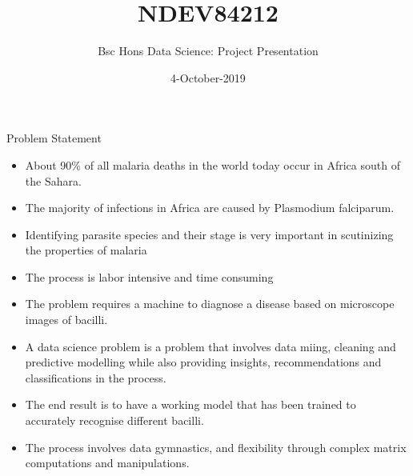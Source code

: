 \documentclass{beamer}
\title[Project Presentation]{NDEV84212}
\author[Olatomiwa Akinlaja]{Bsc Hons Data Science: Project Presentation}
\institute[SPU]{\textbf{\large Olatomiwa O. Akinlaja}}
\date{4-October-2019}
\begin{document}
\frame{\titlepage}
\begin{frame}[t]{Problem Statement}
\vspace{1pt}\small

	\begin{itemize}
	\item About 90\% of all malaria deaths in the world today occur in Africa south of the Sahara.
	\item The majority of infections in Africa are caused by Plasmodium falciparum. 
	\item Identifying parasite species and their stage is very important in scutinizing the properties of malaria
	\item The process is labor intensive and time consuming
	\end{itemize}

	
\end{frame}

\begin{frame}
	\begin{block}{\color{red}{Why is it a data science problem}} \vspace{5pt}\small
		\begin{itemize}
		\item The problem requires a machine to diagnose a disease based on microscope images of bacilli. 
		\item A data science problem is a problem that involves data miing, cleaning and predictive modelling while also providing insights, recommendations and classifications in the process.  
		\end{itemize}
	\end{block}

\begin{block}{\color{red}{Why the solution requires the skills of a data scientist}}\vspace{5pt}\small
	\begin{itemize}
		\item The end result is to have a working model that has been trained to accurately recognise different bacilli.
		
		\item The process involves data gymnastics, and flexibility through complex matrix computations and manipulations.
	\end{itemize}
\end{block}
\end{frame}
\end{document}
